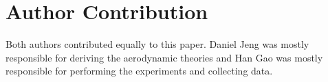 \section{Author Contribution}
Both authors contributed equally to this paper. Daniel Jeng was mostly responsible for deriving the aerodynamic theories and Han Gao was mostly responsible for performing the experiments and collecting data. 